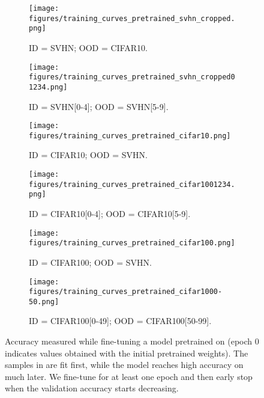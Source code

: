 \begin{figure*}[h]
  \centering

  \begin{subfigure}[r]{0.49\textwidth}
    \centering
    \texttt{[image: figures/training\_curves\_pretrained\_svhn\_cropped.png]}
    \caption{ID = SVHN; OOD = CIFAR10.}
  \end{subfigure}
  \hfill
  \begin{subfigure}[r]{0.49\textwidth}
    \centering
    \texttt{[image: figures/training\_curves\_pretrained\_svhn\_cropped01234.png]}
    \caption{ID = SVHN[0-4]; OOD = SVHN[5-9].}
  \end{subfigure}

  \begin{subfigure}[r]{0.49\textwidth}
    \centering
    \texttt{[image: figures/training\_curves\_pretrained\_cifar10.png]}
    \caption{ID = CIFAR10; OOD = SVHN.}
  \end{subfigure}
  \hfill
  \begin{subfigure}[r]{0.49\textwidth}
    \centering
    \texttt{[image: figures/training\_curves\_pretrained\_cifar1001234.png]}
    \caption{ID = CIFAR10[0-4]; OOD = CIFAR10[5-9].}
    \label{fig:learning_curves_cifar_split}
  \end{subfigure}

  \begin{subfigure}[r]{0.49\textwidth}
    \centering
    \texttt{[image: figures/training\_curves\_pretrained\_cifar100.png]}
    \caption{ID = CIFAR100; OOD = SVHN.}
  \end{subfigure}
  \hfill
  \begin{subfigure}[r]{0.49\textwidth}
    \centering
    \texttt{[image: figures/training\_curves\_pretrained\_cifar1000-50.png]}
    \caption{ID = CIFAR100[0-49]; OOD = CIFAR100[50-99].}
  \end{subfigure}

  \caption{ \small{Accuracy measured while fine-tuning a model
      pretrained on  (epoch 0 indicates values obtained with the
      initial pretrained weights). The samples in  are fit first, while
      the model reaches high accuracy on  much later. We
      fine-tune for at least one epoch and then early stop when the validation
      accuracy starts decreasing.}}

  \label{fig:appendix_training_curves}
\end{figure*}




